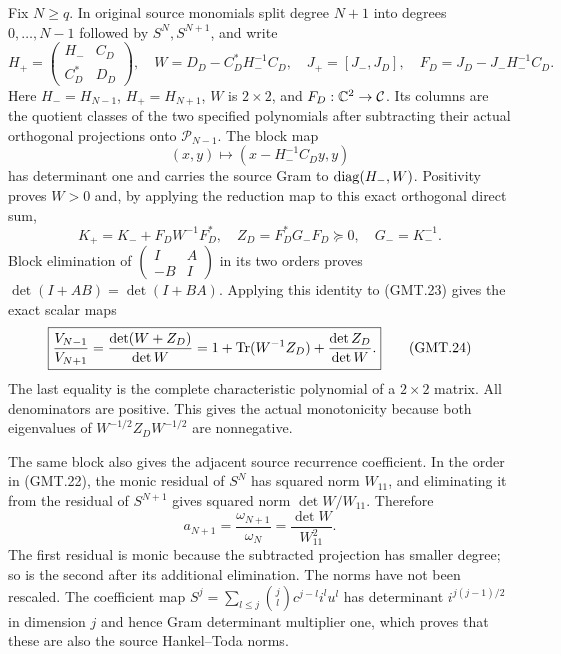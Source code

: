 Fix $N\ge q$. In original source monomials split degree $N+1$
into degrees $0,\ldots,N-1$ followed by $S^N,S^{N+1}$, and write
\[
 H_+=\begin{pmatrix}H_-&C_D\\ C_D^*&D_D\end{pmatrix},\quad
 W=D_D-C_D^*H_-^{-1}C_D,\quad
 J_+=[J_-,J_D],\quad F_D=J_D-J_-H_-^{-1}C_D.                   \tag{GMT.22}
\]
Here $H_-=H_{N-1}$, $H_+=H_{N+1}$, $W$ is $2\times2$, and
$F_D:\mathbb C^2\to\mathcal C$. Its columns are the quotient classes
of the two specified polynomials after subtracting their actual
orthogonal projections onto $\mathcal P_{N-1}$. The block map
\[
 (x,y)\longmapsto(x-H_-^{-1}C_Dy,y)
\]
has determinant one and carries the source Gram to
$\operatorname{diag}(H_-,W)$. Positivity proves $W>0$ and, by applying the
reduction map to this exact orthogonal direct sum,
\[
 K_+=K_-+F_DW^{-1}F_D^*,\quad
 Z_D=F_D^*G_-F_D\succeq0,\quad G_-=K_-^{-1}.                  \tag{GMT.23}
\]
Block elimination of $\left(\begin{smallmatrix}I&A\\-B&I\end{smallmatrix}\right)$
in its two orders proves $\det(I+AB)=\det(I+BA)$.
Applying this identity to (GMT.23) gives the exact scalar maps
\[
 \boxed{\frac{V_{N-1}}{V_{N+1}}
   =\frac{\det(W+Z_D)}{\det W}
   =1+\operatorname{Tr}(W^{-1}Z_D)+\frac{\det Z_D}{\det W}.}                 \tag{GMT.24}
\]
The last equality is the complete characteristic polynomial of a
$2\times2$ matrix. All denominators are positive. This gives the
actual monotonicity because both eigenvalues of
$W^{-1/2}Z_DW^{-1/2}$ are nonnegative.

The same block also gives the adjacent source recurrence coefficient.
In the order in (GMT.22), the monic residual of $S^N$ has squared
norm $W_{11}$, and eliminating it from the residual of $S^{N+1}$
gives squared norm $\det W/W_{11}$. Therefore
\[
 \boxed{a_{N+1}=\frac{\omega_{N+1}}{\omega_N}
                   =\frac{\det W}{W_{11}^2}.}                 \tag{GMT.25}
\]
The first residual is monic because the subtracted projection has
smaller degree; so is the second after its additional elimination.
The norms have not been rescaled. The coefficient map
$S^j=\sum_{l\le j}\binom jl c^{j-l}i^lu^l$ has determinant
$i^{j(j-1)/2}$ in dimension $j$ and hence Gram determinant multiplier
one, which proves that these are also the source Hankel--Toda norms.

